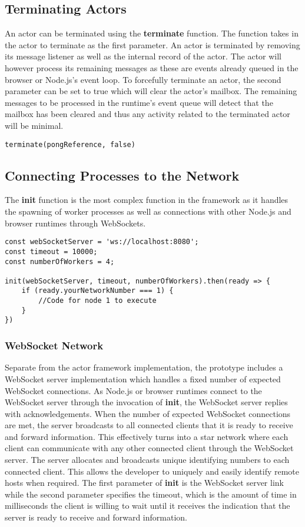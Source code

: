 \documentclass[12pt, a4paper]{report}
\theoremstyle{definition}
\theoremstyle{definition}%
\theoremstyle{definition}%
\theoremstyle{definition}%
\theoremstyle{definition}%
\theoremstyle{definition}%
\begin{document}
\subsection{Terminating Actors}
An actor can be terminated using the \textbf{terminate} function. The function takes in the actor to terminate as the first parameter. An actor is terminated by removing its message listener as well as the internal record of the actor. The actor will however process its remaining messages as these are events already queued in the browser or Node.js's event loop. To forcefully terminate an actor, the second parameter can be set to true which will clear the actor's mailbox. The remaining messages to be processed in the runtime's event queue will detect that the mailbox has been cleared and thus any activity related to the terminated actor will be minimal.
\begin{lstlisting}
terminate(pongReference, false)
\end{lstlisting}
\subsection{Connecting Processes to the Network}
The \textbf{init} function is the most complex function in the framework as it handles the spawning of worker processes as well as connections with other Node.js and browser runtimes through WebSockets.
\begin{lstlisting}
const webSocketServer = 'ws://localhost:8080';
const timeout = 10000;
const numberOfWorkers = 4;

init(webSocketServer, timeout, numberOfWorkers).then(ready => {
    if (ready.yourNetworkNumber === 1) {
        //Code for node 1 to execute
    }
})
\end{lstlisting}
 
\subsubsection{WebSocket Network}
Separate from the actor framework implementation, the prototype includes a WebSocket server implementation which handles a fixed number of expected WebSocket connections. As Node.js or browser runtimes connect to the WebSocket server through the invocation of \textbf{init}, the WebSocket server replies with acknowledgements. When the number of expected WebSocket connections are met, the server broadcasts to all connected clients that it is ready to receive and forward information. This effectively turns into a star network where each client can communicate with any other connected client through the WebSocket server. The server allocates and broadcasts unique identifying numbers to each connected client. This allows the developer to uniquely and easily identify remote hosts when required. The first parameter of \textbf{init} is the WebSocket server link while the second parameter specifies the timeout, which is the amount of time in milliseconds the client is willing to wait until it receives the indication that the server is ready to receive and forward information.
\end{document}
